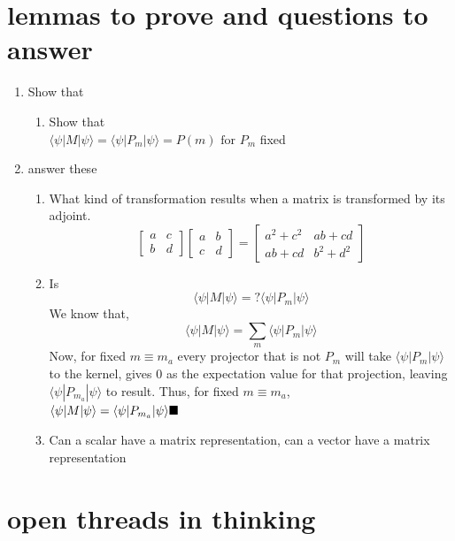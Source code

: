 \documentclass[14pt]{extarticle}
\begin{document}
\section{lemmas to prove and questions to answer}
\begin{enumerate}
    \item Show that
    \begin{enumerate}
    \item Show that \\
        $\langle\psi|M|\psi\rangle = \langle\psi|P_m|\psi\rangle = P(m) \text{ for } P_m $ 
        fixed  
    \end{enumerate}
    \item answer these
    \begin{enumerate}
    \item What kind of transformation results when a matrix is transformed by its adjoint. 
    $$\left[ \begin{array}{cc} a & c \\ b & d \end{array} \right] \left[ \begin{array}{cc} a & b \\ c & d \end{array} \right] = \left[ \begin{array}{cc} a^2+c^2 & ab+cd \\ ab+cd & b^2+d^2 \end{array} \right] $$ 
    \item Is $$ \langle\psi|M|\psi\rangle = ? \langle\psi|P_m|\psi\rangle$$
    We know that, \\
    $$\langle\psi|M|\psi\rangle = \sum_m \langle\psi|P_m|\psi\rangle $$
    Now, for fixed $ m \equiv m_a $ every projector that is not $P_m$ will take $\langle\psi|P_m|\psi\rangle$ to the kernel, gives 0 as the expectation value for that projection, leaving $\langle\psi|P_{m_a}|\psi\rangle$ to result. Thus, for fixed $ m \equiv m_a $, \\
    $ \langle\psi|M|\psi\rangle = \langle\psi|P_{m_a}|\psi\rangle \\\blacksquare$
    \item Can a scalar have a matrix representation, can a vector have a matrix representation
    \end{enumerate}
\end{enumerate}

\section{open threads in thinking}
\end{document}
